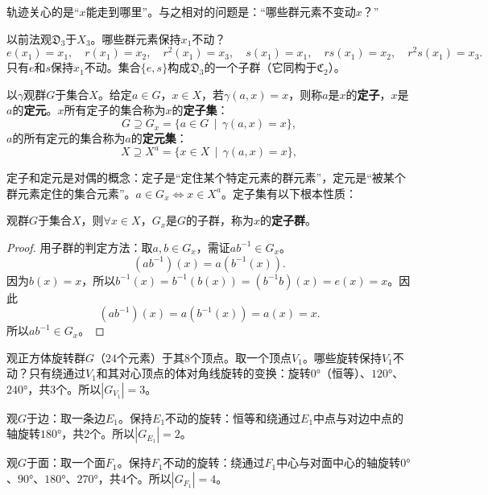 \documentclass[12pt,UTF8,fontset=none]{ctexbook}
\begin{document}
轨迹关心的是“$x$能走到哪里”。与之相对的问题是：“哪些群元素不变动$x$？”

\begin{ex}
以前法观$\mathfrak{D}_3$于$X_3$。哪些群元素保持$x_1$不动？
\[
e(x_1) = x_1,\quad r(x_1) = x_2,\quad r^2(x_1) = x_3,\quad s(x_1) = x_1,\quad rs(x_1) = x_2,\quad r^2s(x_1) = x_3.
\]
只有$e$和$s$保持$x_1$不动。集合$\{e, s\}$构成$\mathfrak{D}_3$的一个子群（它同构于$\mathfrak{C}_2$）。
\end{ex}

\begin{df}\label{df:7-20}
以$\gamma$观群$G$于集合$X$。给定$a\in G$，$x\in X$，若$\gamma(a,x) = x$，则称$a$是$x$的\textbf{定子}，$x$是$a$的\textbf{定元}。$x$所有定子的集合称为$x$的\textbf{定子集}：
\[
G\supseteq G_x = \{a \in G \,\mid \,\gamma(a,x) = x\},
\]
$a$的所有定元的集合称为$a$的\textbf{定元集}：
\[
X\supseteq X^a = \{x \in X\, \mid\, \gamma(a,x) = x\},
\]
\end{df}

定子和定元是对偶的概念：定子是“定住某个特定元素的群元素”，定元是“被某个群元素定住的集合元素”。$a\in G_x \Leftrightarrow x\in X^a$。定子集有以下根本性质：
\begin{pp}\label{pp:7-20}
观群$G$于集合$X$，则$\forall x\in X$，$G_x$是$G$的子群，称为$x$的\textbf{定子群}。
\end{pp}

\begin{proof}
用子群的判定方法：取$a, b \in G_x$，需证$ab^{-1} \in G_x$。
\[
(ab^{-1})(x) = a(b^{-1}(x)).
\]
因为$b(x) = x$，所以$b^{-1}(x) = b^{-1}(b(x)) = (b^{-1}b)(x) = e(x) = x$。因此
\[
(ab^{-1})(x) = a(b^{-1}(x)) = a(x) = x.
\]
所以$ab^{-1} \in G_x$。
\end{proof}

\begin{ex}
观正方体旋转群$G$（$24$个元素）于其$8$个顶点。取一个顶点$V_1$。哪些旋转保持$V_1$不动？只有绕通过$V_1$和其对心顶点的体对角线旋转的变换：旋转$0°$（恒等）、$120°$、$240°$，共$3$个。所以$|G_{V_1}| = 3$。

观$G$于边：取一条边$E_1$。保持$E_1$不动的旋转：恒等和绕通过$E_1$中点与对边中点的轴旋转$180°$，共$2$个。所以$|G_{E_1}| = 2$。

观$G$于面：取一个面$F_1$。保持$F_1$不动的旋转：绕通过$F_1$中心与对面中心的轴旋转$0°$、$90°$、$180°$、$270°$，共$4$个。所以$|G_{F_1}| = 4$。

\end{ex}
\end{document}
